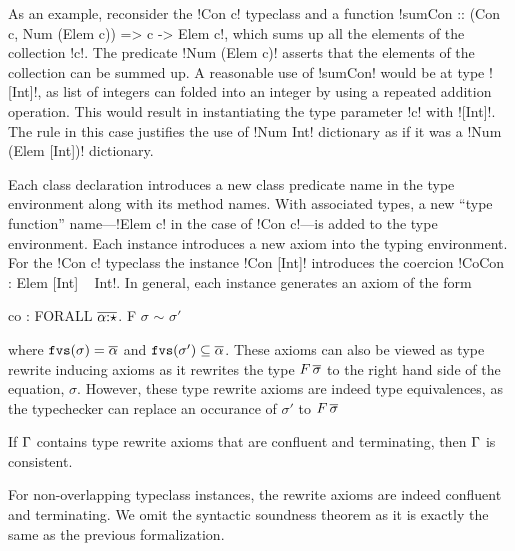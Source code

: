 \documentclass[screen,nonacm,manuscript,review]{acmart} %
\begin{document}
As an example, reconsider the !Con c! typeclass and a function
!sumCon :: (Con c, Num (Elem c)) => c -> Elem c!, which sums up all
the elements of the collection !c!. The predicate !Num (Elem c)!
asserts that the elements of the collection can be summed up. A
reasonable use of !sumCon! would be at type ![Int]!, as list of
integers can folded into an integer by using a repeated addition
operation. This would result in instantiating the type parameter !c!
with ![Int]!. The rule  in this case justifies the use of
!Num Int! dictionary as if it was a !Num (Elem [Int])! dictionary.

Each class declaration introduces a new class predicate name in the
type environment along with its method names. With associated types, a
new ``type function'' name---!Elem c! in the case of !Con c!---is
added to the type environment. Each instance introduces a new axiom
into the typing environment. For the !Con c! typeclass the instance
!Con [Int]! introduces the coercion !CoCon : Elem [Int] ~ Int!.
In general, each instance generates an axiom of the form
\begin{CenteredBox}
\begin{code}
co : FORALL $\overline{\alpha{:}\star}$. F $\sigma$ $\sim$ $\sigma'$
\end{code}
\end{CenteredBox}

where $\texttt{fvs}(\sigma) = \overline{\alpha}$ and $\texttt{fvs}(\sigma') \subseteq \overline{\alpha}$.
These axioms can also be viewed as type rewrite inducing axioms as it
rewrites the type $F\,\overline{\sigma}$ to the right hand side of the
equation, $\sigma$. However, these type rewrite axioms are indeed type
equivalences, as the typechecker can replace an occurance of $\sigma'$
to $F\,\overline{\sigma}$

\begin{theorem}
If $\Gamma$ contains type rewrite axioms that are confluent and
terminating, then $\Gamma$ is consistent.
\end{theorem}
For non-overlapping typeclass instances, the rewrite axioms
are indeed confluent and terminating. We omit the syntactic soundness
theorem as it is exactly the same as the previous formalization.
\end{document}
